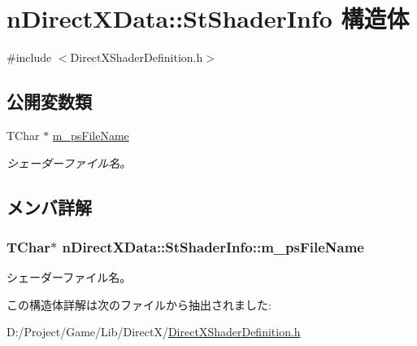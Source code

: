 \hypertarget{structn_direct_x_data_1_1_st_shader_info}{}\section{n\+Direct\+X\+Data\+:\+:St\+Shader\+Info 構造体}
\label{structn_direct_x_data_1_1_st_shader_info}


{\ttfamily \#include $<$Direct\+X\+Shader\+Definition.\+h$>$}

\subsection*{公開変数類}
\begin{DoxyCompactItemize}
\item 
T\+Char $\ast$ \hyperlink{structn_direct_x_data_1_1_st_shader_info_a245ed7c93c662646c0c0bd8ea8ab6583}{m\+\_\+ps\+File\+Name}
\begin{DoxyCompactList}\small\item\em シェーダーファイル名。 \end{DoxyCompactList}\end{DoxyCompactItemize}


\subsection{メンバ詳解}
\hypertarget{structn_direct_x_data_1_1_st_shader_info_a245ed7c93c662646c0c0bd8ea8ab6583}{}
\subsubsection[{m\+\_\+ps\+File\+Name}]{\setlength{\rightskip}{0pt plus 5cm}T\+Char$\ast$ n\+Direct\+X\+Data\+::\+St\+Shader\+Info\+::m\+\_\+ps\+File\+Name}\label{structn_direct_x_data_1_1_st_shader_info_a245ed7c93c662646c0c0bd8ea8ab6583}


シェーダーファイル名。 



この構造体詳解は次のファイルから抽出されました\+:\begin{DoxyCompactItemize}
\item 
D\+:/\+Project/\+Game/\+Lib/\+Direct\+X/\hyperlink{_direct_x_shader_definition_8h}{Direct\+X\+Shader\+Definition.\+h}\end{DoxyCompactItemize}
